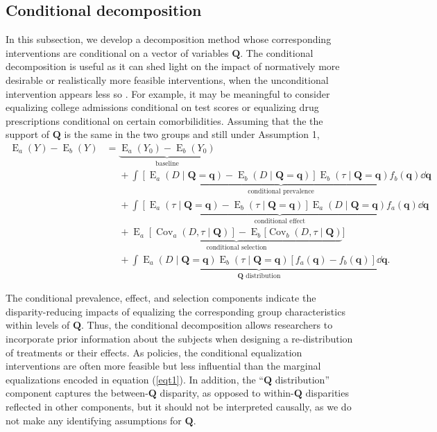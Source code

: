 \documentclass[12pt,a4paper]{article}
\newcommand{\Cov}{\operatorname{Cov}}
\newcommand{\E}{\operatorname{E}}
\def\Q{{\boldsymbol Q}}
\def\q{{\boldsymbol q}}
\begin{document}
\subsection{Conditional decomposition}
In this subsection, we develop a decomposition method whose corresponding interventions are conditional on a vector of variables $\boldsymbol{Q}$. The conditional decomposition is useful as it can shed light on the impact of normatively more desirable or realistically more feasible interventions, when the unconditional intervention appears less so \citep{jackson_meaningful_2021}. For example, it may be meaningful to consider equalizing college admissions conditional on test scores or equalizing drug prescriptions conditional on certain comorbilidities.
Assuming that the the support of $\Q$ is the same in the two groups and still under Assumption 1,
\begin{align}
    \E_a(Y)-\E_b(Y) &= \underbrace{\E_a(Y_0)-\E_b(Y_0)}_{\text{baseline}} \nonumber \\
    &\phantom{{}={}} + \underbrace{\int [\E_a(D \mid \Q=\q)-\E_b(D \mid \Q=\q)]\E_b(\tau \mid \Q=\q) f_b(\q) \dd \q}_{\text{conditional prevalence}} \nonumber \\
    &\phantom{{}={}} + \underbrace{\int [\E_a(\tau \mid \Q=\q)-\E_b(\tau \mid \Q=\q)] \E_a(D \mid \Q=\q) f_a(\q) \dd \q}_{\text{conditional effect}} \nonumber \\
    &\phantom{{}={}} + \underbrace{\E_a[\Cov_a(D, \tau \mid \Q)] - \E_b[\Cov_b(D, \tau \mid \Q)}_{\text{conditional selection}}] \nonumber \\
    &\phantom{{}={}} + \underbrace{\int \E_a(D \mid \Q=\q) \E_b(\tau \mid \Q=\q) [f_a(\q)-f_b(\q)] \dd \q}_{\text{$\Q$ distribution}}.
\end{align}

The conditional prevalence, effect, and selection components indicate the disparity-reducing impacts of equalizing the corresponding group characteristics within levels of $\Q$. Thus, the conditional decomposition allows researchers to incorporate prior information about the subjects when designing a re-distribution of treatments or their effects. As policies, the conditional equalization interventions are often more feasible but less influential than the marginal equalizations encoded in equation (\ref{eqt1}). In addition, the ``$\Q$ distribution'' component captures the between-$\Q$ disparity, as opposed to within-$\Q$ disparities reflected in other components, but it should not be interpreted causally, as we do not make any identifying assumptions for $\Q$.
\end{document}
